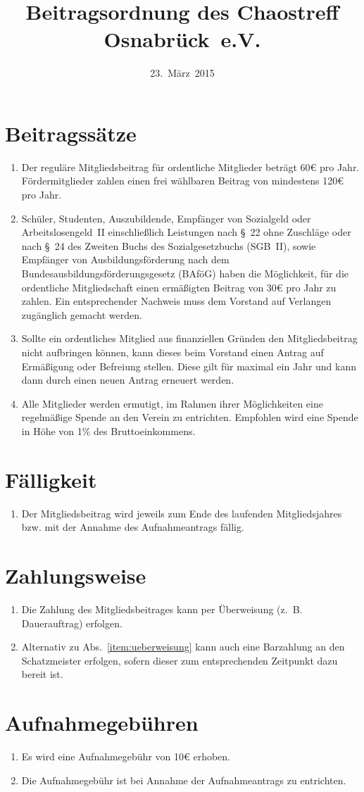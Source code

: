 \documentclass[a4paper,12pt]{scrartcl}
\title{Beitragsordnung des Chaostreff Osnabrück~e.V.}
\date{23.~März~2015}
\begin{document}
\maketitle

\section{Beitragssätze}
\begin{enumerate}
  \item Der reguläre Mitgliedsbeitrag für ordentliche Mitglieder beträgt 60€
    pro Jahr. Fördermitglieder zahlen einen frei wählbaren Beitrag von
    mindestens 120€ pro Jahr.
  \item Schüler, Studenten, Auszubildende, Empfänger von Sozialgeld oder
    Arbeitslosengeld~II einschließlich Leistungen nach §~22 ohne Zuschläge oder
    nach §~24 des Zweiten Buchs des Sozialgesetzbuchs (SGB~II), sowie Empfänger
    von Ausbildungsförderung nach dem Bundesausbildungsförderungsgesetz (BAföG)
    haben die Möglichkeit, für die ordentliche Mitgliedschaft einen ermäßigten
    Beitrag von 30€ pro Jahr zu zahlen. Ein entsprechender Nachweis muss dem
    Vorstand auf Verlangen zugänglich gemacht werden.
  \item Sollte ein ordentliches Mitglied aus finanziellen Gründen den
    Mitgliedsbeitrag nicht aufbringen können, kann dieses beim Vorstand einen
    Antrag auf Ermäßigung oder Befreiung stellen. Diese gilt für maximal ein
    Jahr und kann dann durch einen neuen Antrag erneuert werden.
  \item Alle Mitglieder werden ermutigt, im Rahmen ihrer Möglichkeiten eine
    regelmäßige Spende an den Verein zu entrichten. Empfohlen wird eine Spende
    in Höhe von 1\% des Bruttoeinkommens.
\end{enumerate}

\section{Fälligkeit}
\begin{enumerate}
  \item Der Mitgliedsbeitrag wird jeweils zum Ende des laufenden Mitgliedsjahres bzw. mit der Annahme des Aufnahmeantrags fällig.
\end{enumerate}

\section{Zahlungsweise}
\begin{enumerate}
  \item\label{item:ueberweisung} Die Zahlung des Mitgliedsbeitrages kann per
    Überweisung (z.~B. Dauerauftrag) erfolgen.
  \item Alternativ zu Abs.~\ref{item:ueberweisung} kann auch eine Barzahlung an
    den Schatzmeister erfolgen, sofern dieser zum entsprechenden Zeitpunkt dazu
    bereit ist.
\end{enumerate}

\section{Aufnahmegebühren}
\begin{enumerate}
  \item Es wird eine Aufnahmegebühr von 10€ erhoben.
  \item Die Aufnahmegebühr ist bei Annahme der Aufnahmeantrags zu entrichten.
\end{enumerate}
\end{document}
